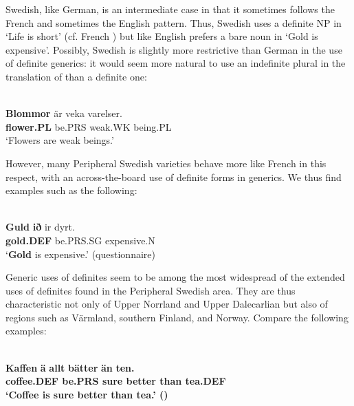 \ea
	\z 
\z



Swedish, like German, is an intermediate case in that it sometimes follows the French and sometimes the English pattern. Thus, Swedish uses a definite NP in  ‘Life is short’ (cf. French ) but like English prefers a bare noun in  ‘Gold is expensive’. Possibly, Swedish is slightly more restrictive than German in the use of definite generics: it would seem more natural to use an indefinite plural in the translation of  than a definite one:

\ea\label{}
\\
\gll	\textbf{Blommor} är  veka  varelser.\\
		\textbf{flower.PL} be.PRS  weak.WK  being.PL\\
\glt	‘Flowers are weak beings.’

\z

However, many Peripheral Swedish varieties behave more like French in this respect, with an across-the-board use of definite forms in generics. We thus find examples such as the following:

\ea\label{}
\\
\gll	\textbf{Guld} \textbf{ið} ir  dyrt.  \\
		\textbf{gold.DEF} be.PRS.SG  expensive.N  \\
\glt	‘\textbf{Gold} is expensive.’ (questionnaire)

\z

Generic uses of definites seem to be among the most widespread of the extended uses of definites found in the Peripheral Swedish area. They are thus characteristic not only of Upper Norrland and Upper Dalecarlian but also of regions such as Värmland, southern Finland, and Norway. Compare the following examples:

\ea\label{}
\\
\gll	\textbf{Kaffen} \textbf{ä} \textbf{  allt} \textbf{  bätter} \textbf{  än} \textbf{ten.}\\
		\bfseries coffee.DEF  be.PRS  sure  better   than  tea.DEF\\
\glt	‘Coffee is sure better than tea.’ (\citet{Broberg1936})

